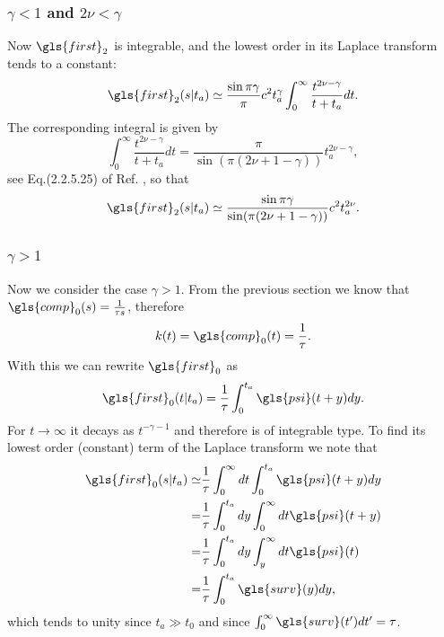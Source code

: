 \subsubsection{$\gamma <1$  and $2\nu < \gamma $} 
Now $\gls{first}_2$ is integrable, and the lowest order in its Laplace transform tends to a constant:
\begin{equation}
 \gls{first}_2(s|t_a) \simeq \frac{\sin \pi \gamma}{\pi}  c^2 t_a^\gamma \int_0^\infty \frac{ t^{2\nu-\gamma}}{t+t_a} dt.
\end{equation}
The corresponding integral is given by
\begin{equation}
 \int_0^\infty \frac{t^{2\nu-\gamma}}{t+t_a} dt = \frac{\pi }{\sin (\pi(2\nu +1- \gamma))}t_a^{2\nu - \gamma} ,
\end{equation}
see Eq.(2.2.5.25) of Ref. \cite{BryPr}, so that
\begin{equation}
 \gls{first}_2(s|t_a) \simeq   \frac{\sin \pi \gamma}{\sin (\pi(2\nu +1- \gamma))}c^2 t_a^{2\nu}.
\end{equation}

\subsubsection{$\gamma > 1$}
Now we consider the case $\gamma > 1$. From the previous section we know that $\gls{comp}_0(s)=\frac{1}{\tau s}$, therefore
\begin{equation}
k(t) =\gls{comp}_0(t)= \frac{1}{\tau} . \label{eqn:kGammaLarge}
\end{equation}
With this we can rewrite $\gls{first}_0$ as 
\begin{equation}
 \gls{first}_0(t|t_a) = \frac{1}{\tau} \int_0^{t_a} \gls{psi}(t+y)dy.
\end{equation}
For $t \to \infty$ it decays as $t^{-\gamma-1}$ and therefore is of integrable type. To find its lowest order (constant) term of the Laplace transform we note that
\begin{align}
 \gls{first}_0(s|t_a) \simeq & \frac{1}{\tau} \int_0^\infty dt \int_0^{t_a} \gls{psi}(t+y)dy \\
 =& \frac{1}{\tau} \int_0^{t_a} dy \int_0^\infty dt \gls{psi}(t+y)  \\
 =& \frac{1}{\tau} \int_0^{t_a} dy \int_y^\infty dt \gls{psi}(t) \\
 =& \frac{1}{\tau} \int^{t_a}_0 \gls{surv}(y) dy,
\end{align}
which tends to unity since $t_a \gg t_0$ and since $\int_0^\infty \gls{surv}(t') dt' = \tau$. \\

